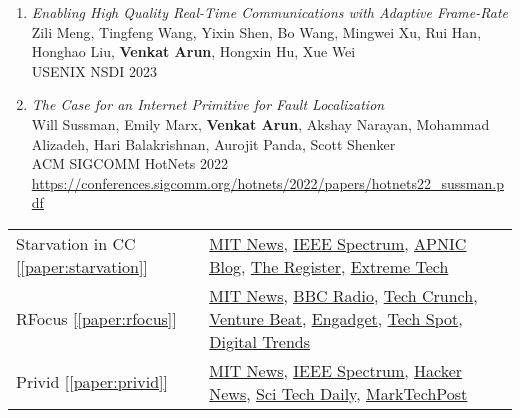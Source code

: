 \documentclass[notitlepage]{article}
\newcommand{\heading}[1]{\vspace{1em}{\large \MakeUppercase{\textrm{#1}}}

  \hrulefill
}
\begin{document}
\begin{enumerate}
\item {\it Enabling High Quality Real-Time Communications with Adaptive Frame-Rate}\\
  Zili Meng, Tingfeng Wang, Yixin Shen, Bo Wang, Mingwei Xu, Rui Han, Honghao Liu, {\bf Venkat Arun}, Hongxin Hu, Xue Wei\\
  USENIX NSDI 2023\\
\item {\it The Case for an Internet Primitive for Fault Localization}\\
  Will Sussman, Emily Marx, {\bf Venkat Arun}, Akshay Narayan, Mohammad Alizadeh, Hari Balakrishnan, Aurojit Panda, Scott Shenker\\
  ACM SIGCOMM HotNets 2022\\
  \url{https://conferences.sigcomm.org/hotnets/2022/papers/hotnets22_sussman.pdf}
\end{enumerate}
\fi

\heading{Selected Press Coverage}

\begin{tabular}{l l}
  Starvation in CC [\ref{paper:starvation}] &
  \href{https://news.mit.edu/2022/algorithm-computer-network-bandwidth-0804}{MIT News},
  \underline{\href{https://spectrum.ieee.org/internet-congestion-control}{IEEE Spectrum}},
  \underline{\href{https://blog.apnic.net/2022/11/23/congestion-control-algorithms-are-not-fair/}{APNIC Blog}},
  \href{https://www.theregister.com/2022/08/22/network_congestion_algorithms/?td=keepreading}{The Register},
  \href{https://www.extremetech.com/internet/338610-mit-researchers-say-all-network-congestion-algorithms-are-unfair}{Extreme Tech}\\
  RFocus [\ref{paper:rfocus}] &
  \href{https://news.mit.edu/2020/smart-surface-smart-devices-mit-csail-0203}{MIT News},
  \underline{\href{https://www.bbc.co.uk/programmes/p08271xg}{BBC Radio}},
  \href{https://techcrunch.com/2020/02/03/mits-rfocus-technology-could-turn-your-walls-into-antennas/}{Tech Crunch},
  \href{https://venturebeat.com/mobile/mit-csails-rfocus-boosts-wireless-signal-strength-by-a-factor-of-nearly-10/}{Venture Beat},
  \href{https://www.engadget.com/2020-02-03-mit-rfocus-smart-surface.html}{Engadget},
  \href{https://www.techspot.com/news/83869-mit-rfocus-smart-surface-uses-tiny-antennas-amplify.html}{Tech Spot},
  \href{https://www.digitaltrends.com/news/rfocus-smart-wallpaper-boosts-signal-strength/}{Digital Trends}\\
  Privid [\ref{paper:privid}] &
  \href{https://news.mit.edu/2022/privid-security-tool-guarantees-privacy-surveillance-footage-0328}{MIT News},
  \underline{\href{https://spectrum.ieee.org/surveillance-privacy}{IEEE Spectrum}},
  \href{https://thehackernews.com/2022/03/privid-privacy-preserving-surveillance.html}{Hacker News},
  \href{https://scitechdaily.com/security-tool-privid-guarantees-privacy-in-surveillance-footage/}{Sci Tech Daily},
  \href{https://www.marktechpost.com/2022/03/30/researchers-from-mit-csail-introduce-privid-an-ai-tool-build-on-differential-privacy-to-guarantee-privacy-in-video-footage-from-surveillance-cameras/}{MarkTechPost}

\end{tabular}
\end{document}

